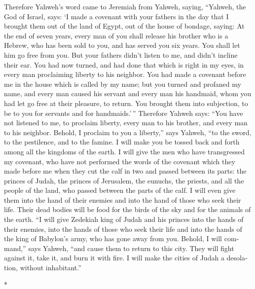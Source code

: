 \begin{paracol}{2}
\begin{otherlanguage}{english}
 Therefore Yahweh's word came to Jeremiah from Yahweh,
saying,  ``Yahweh, the God of Israel, says: `I made a
covenant with your fathers in the day that I brought them out of the
land of Egypt, out of the house of bondage, saying:  At
the end of seven years, every man of you shall release his brother who
is a Hebrew, who has been sold to you, and has served you six years. You
shall let him go free from you. But your fathers didn't listen to me,
and didn't incline their ear.  You had now turned, and
had done that which is right in my eyes, in every man proclaiming
liberty to his neighbor. You had made a covenant before me in the house
which is called by my name;  but you turned and profaned
my name, and every man caused his servant and every man his handmaid,
whom you had let go free at their pleasure, to return. You brought them
into subjection, to be to you for servants and for handmaids.'\,''
 Therefore Yahweh says: ``You have not listened to me, to
proclaim liberty, every man to his brother, and every man to his
neighbor. Behold, I proclaim to you a liberty,'' says Yahweh, ``to the
sword, to the pestilence, and to the famine. I will make you be tossed
back and forth among all the kingdoms of the earth.  I
will give the men who have transgressed my covenant, who have not
performed the words of the covenant which they made before me when they
cut the calf in two and passed between its parts:  the
princes of Judah, the princes of Jerusalem, the eunuchs, the priests,
and all the people of the land, who passed between the parts of the
calf.  I will even give them into the hand of their
enemies and into the hand of those who seek their life. Their dead
bodies will be food for the birds of the sky and for the animals of the
earth.  ``I will give Zedekiah king of Judah and his
princes into the hands of their enemies, into the hands of those who
seek their life and into the hands of the king of Babylon's army, who
has gone away from you.  Behold, I will command,'' says
Yahweh, ``and cause them to return to this city. They will fight against
it, take it, and burn it with fire. I will make the cities of Judah a
desolation, without inhabitant.''

\end{otherlanguage}

\switchcolumn[0]*

\hypertarget{por-mandato-divino-jeremuxedas-prueba-la-fidelidad-de-los-recabitas}{%
}
\end{paracol}
